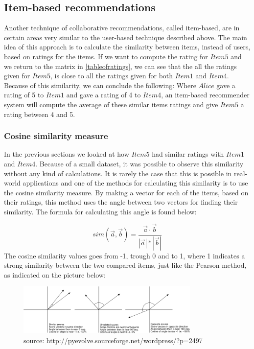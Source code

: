 \subsection{Item-based recommendations} %
\label{sub:item_based_recommendations}
Another technique of collaborative recommendations, called item-based, are in certain areas very similar to the user-based technique described above. The main idea of this approach is to calculate the similarity between items, instead of users, based on ratings for the items. If we want to compute the rating for \(Item5\) and we return to the matrix in \ref{tableofratings}, we can see that the all the ratings given for \(Item5\), is close to all the ratings given for both \(Item1\) and \(Item4\). Because of this similarity, we can conclude the following: Where \(Alice\) gave a rating of 5 to \(Item1\) and gave a rating of 4 to \(Item4\), an item-based recommender system will compute the average of these similar items ratings and give \(Item5\) a rating between 4 and 5.

\subsubsection{Cosine similarity measure}
In the previous sections we looked at how \(Item5\) had similar ratings with \(Item1\) and \(Item4\). Because of a small dataset, it was possible to observe this similarity without any kind of calculations. It is rarely the case that this is possible in real-world applications and one of the methods for calculating this similarity is to use the cosine similarity measure. \newline 
By making a vector for each of the items, based on their ratings, this method uses the angle between two vectors for finding their similarity. The formula for calculating this angle is found below:

\[
	sim(\vec{a}, \vec{b}) = \frac{\vec{a} \cdot \vec{b}}{|\vec{a}| * |\vec{b}| }
\]
\newline
The cosine similarity values goes from -1, trough 0 and to 1, where 1 indicates a strong similarity between the two compared items, just like the Pearson method, as indicated on the picture below:

\begin{figure}[H]
\centering
\includegraphics[width=90mm]{Pictures/cosinesimilarity.png}
\caption{source: http://pyevolve.sourceforge.net/wordpress/?p=2497}
\label{cosinesimilarity}
\end{figure}

